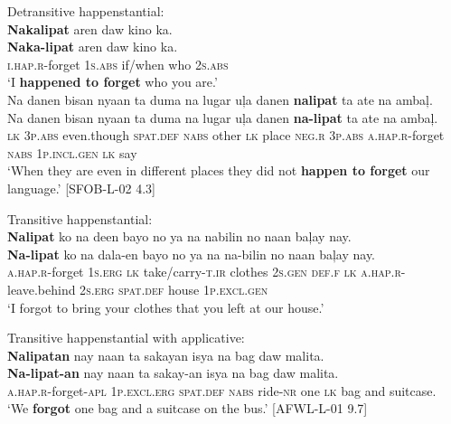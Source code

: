 \ea
Detransitive happenstantial: \\
\textbf{Nakalipat}  aren  daw  kino  ka. \\\smallskip
\gll \textbf{Naka-lipat}  aren  daw  kino  ka. \\
\textsc{i.hap.r}-forget  1\textsc{s.abs}  if/when  who  2\textsc{s.abs} \\
\glt ‘I \textbf{happened to forget} who you are.’ \\
\z
\ea
Na  danen  bisan  nyaan  ta  duma  na  lugar  uļa  danen \textbf{nalipat}  ta  ate  na  ambaļ. \\\smallskip
\gll Na  danen  bisan  nyaan  ta  duma  na  lugar  uļa  danen \textbf{na-lipat}  ta  ate  na  ambaļ. \\
\textsc{lk}  3\textsc{p.abs}  even.though  \textsc{spat.def}  \textsc{nabs}  other  \textsc{lk}  place  \textsc{neg.r}  3\textsc{p.abs}
\textsc{a.hap.r}-forget  \textsc{nabs}  1\textsc{p.incl.gen}  \textsc{lk}  say \\
\glt `When they are even in different places they did not \textbf{happen to forget} our language.’ [SFOB-L-02 4.3]
\z

\ea
Transitive happenstantial: \\ 
\textbf{Nalipat}  ko  na  deen  bayo  no  ya  na nabilin  no  naan  baļay  nay. \\\smallskip
\gll \textbf{Na-lipat}  ko  na  dala-en  bayo  no  ya  na na-bilin  no  naan  baļay  nay. \\
\textsc{a.hap.r}-forget  1\textsc{s.erg}  \textsc{lk}  take/carry-\textsc{t.ir}  clothes  2\textsc{s.gen}  \textsc{def.f}  \textsc{lk}
\textsc{a.hap.r}-leave.behind  2\textsc{s.erg}  \textsc{spat.def}  house  1\textsc{p.excl.gen} \\
\glt ‘I forgot to bring your clothes that you left at our house.’
\z

\newpage
\ea
Transitive happenstantial with applicative: \\
\textbf{Nalipatan}  nay  naan  ta  sakayan  isya  na  bag daw  malita. \\\smallskip
\gll \textbf{Na-lipat-an}  nay  naan  ta  sakay-an  isya  na  bag daw  malita. \\
\textsc{a.hap.r}-forget-\textsc{apl}  1\textsc{p.excl.erg}  \textsc{spat.def}  \textsc{nabs}  ride-\textsc{nr}  one  \textsc{lk}  bag and  suitcase. \\
\glt `We \textbf{forgot} one bag and a suitcase on the bus.’ [AFWL-L-01 9.7]
\z

